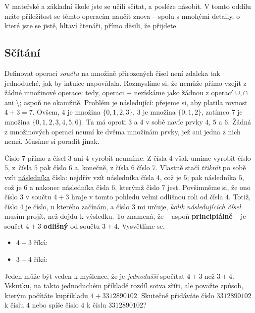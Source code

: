 V mateřské a základní škole jste se učili sčítat, a posléze násobit. V tomto
oddílu máte příležitost se těmto operacím naučit znova -- spolu s mnohými
detaily, o které jste se jistě, hltaví čtenáři, přímo děsili, že přijdete.

\subsection{Sčítání}
\label{ssec:scitani}

Definovat operaci \emph{součtu} na množině přirozených čísel není zdaleka tak
jednoduché, jak by intuice napovídala. Rozmyslíme si, že nemůže přímo vzejít z
žádné množinové operace: tedy, operaci $+$ nezískáme jako žádnou z operací $
\cup , \cap $ ani $ \setminus $; aspoň ne okamžitě. Problém je následující:
přejeme si, aby platila rovnost $4 + 3 = 7$. Ovšem, $4$ je množina $\{0, 1, 2,
3\}$, $3$ je množina $\{0, 1, 2\}$, zatímco $7$ je množina $\{0, 1, 2, 3, 4, 5,
6\}$. Ta má oproti $3$ a $4$ v sobě navíc prvky $4$, $5$ a $6$. Žádná z
množinových operací neumí ke dvěma množinám  prvky, jež ani jedna
z nich nemá. Musíme si poradit jinak.

Číslo $7$ přímo z čísel $3$ ani $4$ vyrobit neumíme. Z čísla $4$ však umíme
vyrobit číslo $5$, z~čísla $5$ pak číslo $6$ a, konečně, z čísla $6$ číslo $7$.
Vlastně stačí \emph{třikrát} po sobě vzít \hyperref[def:naslednik]{následníka}
čísla: nejdřív vzít následníka čísla $4$, což je $5$; pak následníka $5$, což je
$6$ a nakonec následníka čísla $6$, kterýmž číslo $7$ jest. Povšimněme si, že
ono číslo $3$ v součtu $4 + 3$ hraje v tomto pohledu velmi odlišnou roli od
čísla $4$. Totiž, číslo $4$ je číslo, u kterého začínám, a číslo $3$ mi určuje,
\emph{kolik následujících čísel} musím projít, než dojdu k výsledku. To znamená,
že -- aspoň \textbf{principiálně} -- je součet $4 + 3$ \textbf{odlišný} od
součtu $3 + 4$. Vysvětlíme se.
\begin{itemize}
  \item $4 + 3$ říká: 
  \item $3 + 4$ říká: 
\end{itemize}
Jeden může být veden k myšlence, že je \emph{jednodušší} spočítat $4 + 3$ než $3
+ 4$. Vskutku, na takto jednoduchém příkladě rozdíl sotva zříti, ale považte
způsob, kterým počítáte kupříkladu $4 + 3312890102$. Skutečně přidáváte číslo
$3312890102$ k číslu $4$ nebo spíše číslo $4$ k číslu $3312890102$?

